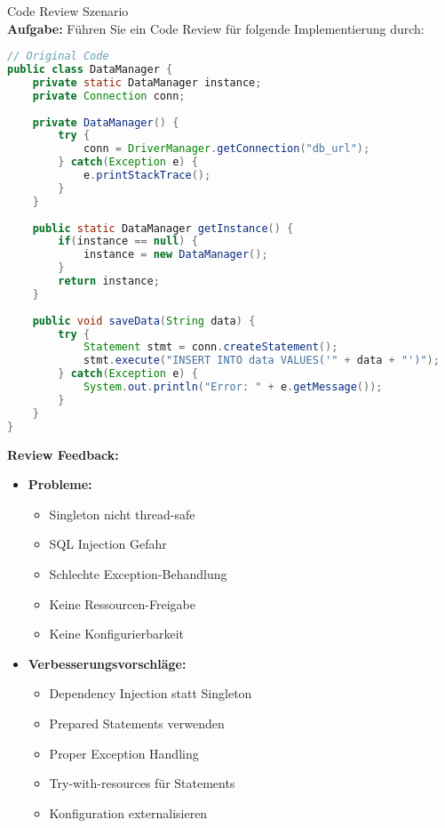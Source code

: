 \begin{example2}[breakable]{Code Review Szenario}\\
\textbf{Aufgabe:} Führen Sie ein Code Review für folgende Implementierung durch:

\begin{lstlisting}[language=Java, style=base]
// Original Code
public class DataManager {
    private static DataManager instance;
    private Connection conn;
    
    private DataManager() {
        try {
            conn = DriverManager.getConnection("db_url");
        } catch(Exception e) {
            e.printStackTrace();
        }
    }
    
    public static DataManager getInstance() {
        if(instance == null) {
            instance = new DataManager();
        }
        return instance;
    }
    
    public void saveData(String data) {
        try {
            Statement stmt = conn.createStatement();
            stmt.execute("INSERT INTO data VALUES('" + data + "')");
        } catch(Exception e) {
            System.out.println("Error: " + e.getMessage());
        }
    }
}
\end{lstlisting}

\textbf{Review Feedback:}
\begin{itemize}
    \item \textbf{Probleme:}
    \begin{itemize}
        \item Singleton nicht thread-safe
        \item SQL Injection Gefahr
        \item Schlechte Exception-Behandlung
        \item Keine Ressourcen-Freigabe
        \item Keine Konfigurierbarkeit
    \end{itemize}
    
    \item \textbf{Verbesserungsvorschläge:}
    \begin{itemize}
        \item Dependency Injection statt Singleton
        \item Prepared Statements verwenden
        \item Proper Exception Handling
        \item Try-with-resources für Statements
        \item Konfiguration externalisieren
    \end{itemize}
\end{itemize}


\end{example2}
